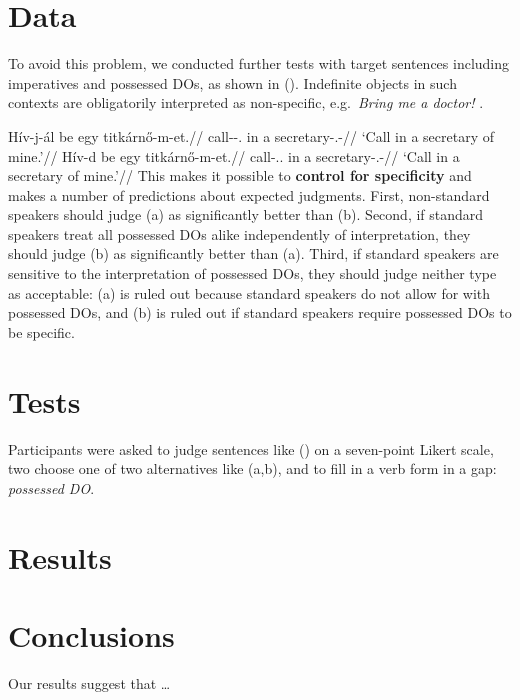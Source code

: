\documentclass[fontsize=12pt]{scrartcl}
\begin{document}
\section{Data} To avoid this problem, we conducted further tests with target
sentences including imperatives and possessed DOs, as shown in (\nextx).
Indefinite objects in such contexts are obligatorily interpreted as
non-specific, e.g.\ \emph{Bring me a doctor!} \parencite[154]{Abbott2010}.

\pex
    \a
    \begingl{}
        \gla    Hív-j-ál be egy titkárnő-m-et.//
        \glb    call-\Imp-\Ssg.\Sbj{} in a secretary-\Poss.\Fsg-\Acc{}//
        \glft   `Call in a secretary of mine.'//
    \endgl
    \a
    \begingl{}
        \gla    Hív-d be egy titkárnő-m-et.//
        \glb    call-\Imp.\Ssg.\Obj{} in a secretary-\Poss.\Fsg-\Acc{}//
        \glft   `Call in a secretary of mine.'//
    \endgl
\xe
This makes it possible to \textbf{control for specificity} and makes a number
of predictions about expected judgments. First, non-standard speakers should
judge (\lastx a) as significantly better than (\lastx b). Second, if standard
speakers treat all possessed DOs alike independently of interpretation, they
should judge (\lastx b) as significantly better than (\lastx a). Third, if
standard speakers are sensitive to the interpretation of possessed DOs, they
should judge neither type as acceptable: (\lastx a) is ruled out because
standard speakers do not allow for \Sbj{} with possessed DOs, and (\lastx b) is
ruled out if standard speakers require possessed DOs to be specific.

\section{Tests} Participants were asked to judge sentences like (\lastx) on a
seven-point Likert scale, two choose one of two alternatives like (\lastx a,b),
and to fill in a verb form in a gap: \underline{\hphantom{2em}} \emph{possessed
    DO}.

\section{Results}

\section{Conclusions} Our results suggest that \ldots{}

\newrefcontext[sorting=nyt]
\printbibliography
\end{document}
